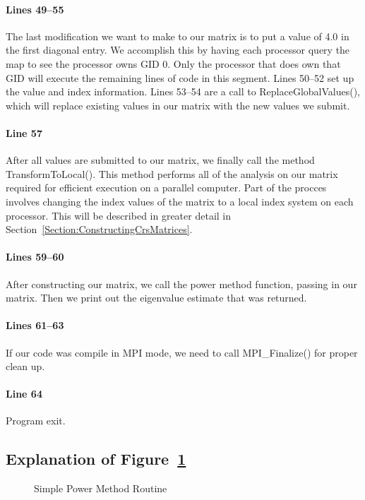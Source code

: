 \documentclass[12pt,relax]{EpetraUserGuide}
\begin{document}
\paragraph{Lines 49--55}
The last modification we want to make to our matrix is to put a value
of 4.0 in the first diagonal entry.  We accomplish this by having each
processor query the map to see the processor owns GID 0.  Only the
processor that does own that GID will execute the remaining lines of
code in this segment.  Lines 50--52 set up the value and index
information.  Lines 53--54 are a call to ReplaceGlobalValues(), which
will replace existing values in our matrix with the new values we submit.
\paragraph{Line 57}
After all values are submitted to our matrix, we finally call the
method TransformToLocal().  This method performs all of the analysis
on our matrix required for efficient execution on a parallel
computer.  Part of the procces involves changing the index values of
the matrix to a local index system on each processor.  This will be
described in greater detail in
Section~\ref{Section:ConstructingCrsMatrices}.
\paragraph{Lines 59--60}
After constructing our matrix, we call the power method function,
passing in our matrix.  Then we print out the eigenvalue estimate that
was returned.
\paragraph{Lines 61--63}
If our code was compile in MPI mode, we need to call MPI\_Finalize()
for proper clean up.
\paragraph{Line 64} Program exit.

\subsection{Explanation of Figure~\ref{Figure:PowerMethod}}

\begin{figure}
\begin{center}

\end{center}
\caption{\label{Figure:PowerMethod} Simple Power Method Routine}
\end{figure}
\end{document}
